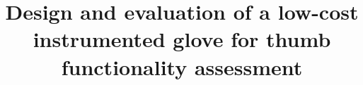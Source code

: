 \documentclass{bmcart}
\begin{document}
\begin{frontmatter}

\begin{fmbox}


\title{Design and evaluation of a low-cost instrumented glove for thumb functionality assessment}


\author[
   addressref={unisi},                   %
   corref={unisi},                       %
   email={pompili@diism.unisi.it}   %
]{ }
%
\author[
   addressref={unisi,iit},%
   email={lisini@diism.unisi.it}%
]{ }
%
\author[
   addressref={unisi,iit},
   email={scal@diism.unisi.it}
]{ }
%
\author[
   addressref={unisi},
   email={meli@diism.unisi.it}
]{ }
%
\author[
   addressref={unisi,iit},
   email={prattichizzo@diism.unisi.it}
]{ }

\address[id=unisi]{%
  , %
 ,                     %
 ,                              %
}
  

\end{fmbox}
\end{frontmatter}
\end{document}
